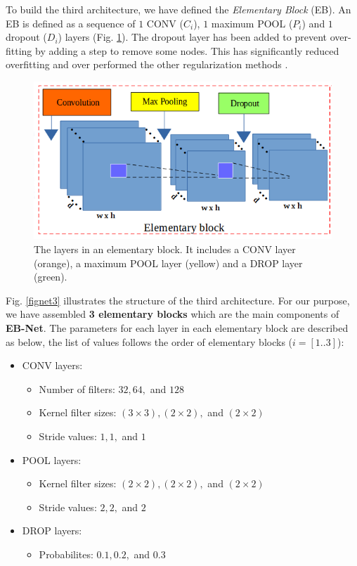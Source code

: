 \documentclass[review]{elsarticle}
\begin{document}
To build the third architecture, we have defined the
\textit{Elementary Block} (EB). An EB is defined as a sequence of $1$
CONV ($C_{i}$), $1$ maximum POOL ($P_i$) and $1$ dropout ($D_i$)
layers (Fig. \ref{figelementary}). The dropout layer has been added to
prevent over-fitting by adding a step to remove some nodes. This has
significantly reduced overfitting and over performed the other
regularization methods \cite{srivastava2014dropout}.


\begin{figure}[h]
	\centering
	\includegraphics[scale=0.3]{images/elementary_block}
	\caption{The layers in an elementary block. It includes a CONV layer (orange), a maximum POOL layer (yellow) and a DROP layer (green).}
	\label{figelementary}
\end{figure}

Fig. \ref{fignet3} illustrates the structure of the third
architecture. For our purpose, we have assembled \textbf{3 elementary
  blocks} which are the main components of \textbf{EB-Net}. The
parameters for each layer in each elementary block are described as
below, the list of values follows the order of elementary blocks ($i =
[1..3]$):

\begin{itemize}
	\item CONV layers:
	\begin{itemize}
		\item Number of filters: $32, 64, $ and $128$
		\item Kernel filter sizes: $(3 \times 3), (2 \times 2), $ and $(2 \times 2)$
		\item Stride values: $1, 1, $ and $1$ 
	\end{itemize}
	\item POOL layers:
		\begin{itemize}
			\item Kernel filter sizes: $(2 \times 2), (2 \times 2), $ and $(2 \times 2)$
			\item Stride values: $2, 2, $ and $2$
		\end{itemize}
	\item DROP layers:
		\begin{itemize}
			\item Probabilites: $0.1, 0.2, $ and $0.3$
		\end{itemize}
\end{itemize}
\end{document}
